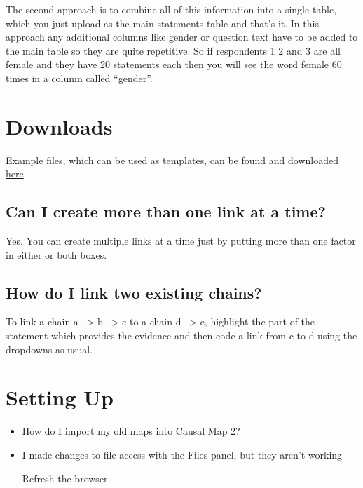 \documentclass[
]{book}
\begin{document}
The second approach is to combine all of this information into a single table, which you just upload as the main statements table and that's it. In this approach any additional columns like gender or question text have to be added to the main table so they are quite repetitive. So if respondents 1 2 and 3 are all female and they have 20 statements each then you will see the word female 60 times in a column called ``gender''.

\hypertarget{downloads}{%
\section{Downloads}\label{downloads}}

Example files, which can be used as templates, can be found and downloaded \href{https://drive.google.com/drive/folders/1wvifDQ0BXmAjSudTRUv9i_4JURpphD4v}{here}

\hypertarget{can-i-create-more-than-one-link-at-a-time}{%
\subsection{Can I create more than one link at a time?}\label{can-i-create-more-than-one-link-at-a-time}}

Yes. You can create multiple links at a time just by putting more than one factor in either or both boxes.

\hypertarget{how-do-i-link-two-existing-chains}{%
\subsection{How do I link two existing chains?}\label{how-do-i-link-two-existing-chains}}

To link a chain a --\textgreater{} b --\textgreater{} c to a chain d --\textgreater{} e, highlight the part of the statement which provides the evidence and then code a link from c to d using the dropdowns as usual.

\hypertarget{setting-up}{%
\section{Setting Up}\label{setting-up}}

\begin{itemize}
\item
  How do I import my old maps into Causal Map 2?
\item
  I made changes to file access with the Files panel, but they aren't working

  Refresh the browser.
\end{itemize}
\end{document}

